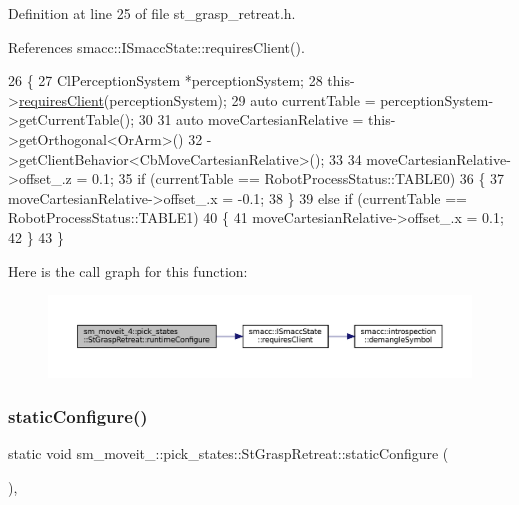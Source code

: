 Definition at line 25 of file st\+\_\+grasp\+\_\+retreat.\+h.



References smacc\+::\+I\+Smacc\+State\+::requires\+Client().


\begin{DoxyCode}
26     \{
27         ClPerceptionSystem *perceptionSystem;
28         this->\hyperlink{classsmacc_1_1ISmaccState_a7f95c9f0a6ea2d6f18d1aec0519de4ac}{requiresClient}(perceptionSystem);
29         \textcolor{keyword}{auto} currentTable = perceptionSystem->getCurrentTable();
30 
31         \textcolor{keyword}{auto} moveCartesianRelative = this->getOrthogonal<OrArm>()
32                                          ->getClientBehavior<CbMoveCartesianRelative>();
33 
34         moveCartesianRelative->offset\_.z = 0.1;
35         \textcolor{keywordflow}{if} (currentTable == RobotProcessStatus::TABLE0)
36         \{
37             moveCartesianRelative->offset\_.x = -0.1;
38         \}
39         \textcolor{keywordflow}{else} \textcolor{keywordflow}{if} (currentTable == RobotProcessStatus::TABLE1)
40         \{
41             moveCartesianRelative->offset\_.x = 0.1;
42         \}
43     \}
\end{DoxyCode}
Here is the call graph for this function\+:
\nopagebreak
\begin{figure}[H]
\begin{center}
\leavevmode
\includegraphics[width=350pt]{structsm__moveit__4_1_1pick__states_1_1StGraspRetreat_a2d386f511e377a4b0eb8193cd24ddb84_cgraph}
\end{center}
\end{figure}
\mbox{\label{structsm__moveit__4_1_1pick__states_1_1StGraspRetreat_a678250d9b3296956f285a2bc27af6641}} 
\subsubsection{\texorpdfstring{static\+Configure()}{staticConfigure()}}
{\footnotesize\ttfamily static void sm\+\_\+moveit\+\_\+::pick\+\_\+states\+::\+St\+Grasp\+Retreat\+::static\+Configure (\begin{DoxyParamCaption}{ }\end{DoxyParamCaption})\hspace{0.3cm}{\ttfamily [inline]}, {\ttfamily [static]}}



